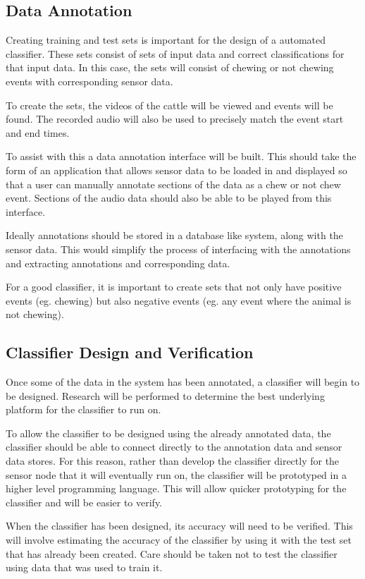 \subsection{Data Annotation}

Creating training and test sets is important for the design of a automated classifier. These sets consist of sets of input data and correct classifications for that input data. In this case, the sets will consist of chewing or not chewing events with corresponding sensor data. 

To create the sets, the videos of the cattle will be viewed and events will be found. The recorded audio will also be used to precisely match the event start and end times.  

To assist with this a data annotation interface  will be built. This should take the form of an application that allows sensor data to be loaded in and displayed so that a user can manually annotate sections of the data as a chew or not chew event. Sections of the audio data should also be able to be played from this interface. 

Ideally annotations should be stored in a database like system, along with the sensor data. This would simplify the process of interfacing with the annotations and extracting annotations and corresponding data. 

For a good classifier, it is important to create sets that not only have positive events (eg. chewing) but also negative events (eg. any event where the animal is not chewing).

\subsection{Classifier Design and Verification} 

Once some of the data in the system has been annotated, a classifier will begin to be designed. Research will be performed to determine the best underlying platform for the classifier to run on. 

To allow the classifier to be designed using the already annotated data, the classifier should be able to connect directly to the annotation data and sensor data stores. For this reason, rather than develop the classifier directly for the sensor node that it will eventually run on, the classifier will be prototyped in a higher level programming language. This will allow quicker prototyping for the classifier and will be easier to verify.

When the classifier has been designed, its accuracy will need to be verified. This will involve estimating the accuracy of the classifier by using it with the test set that has already been created. Care should be taken not to test the classifier using data that was used to train it. 
\newpage
